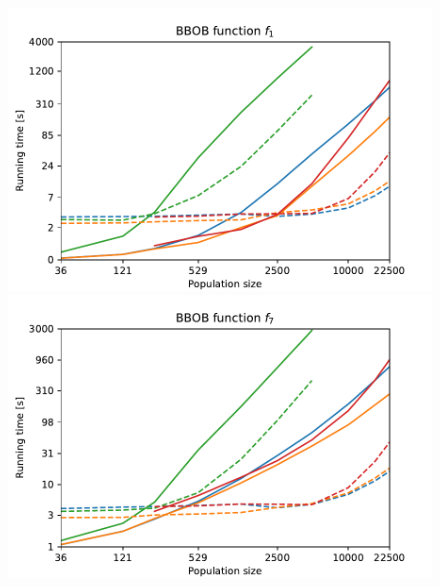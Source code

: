\begin{figure}[ht!]
    \begin{minipage}[t]{0.32\textwidth}
        \centering
        \includegraphics[width=\textwidth]{img/runs/time_pso2006_fn1_neigh.pdf}
    \end{minipage}
    \hfill
    \begin{minipage}[t]{0.32\textwidth}
        \centering
        \includegraphics[width=\textwidth]{img/runs/time_pso2006_fn7_neigh.pdf}
    \end{minipage}
    \hfill
    \begin{minipage}[t]{0.32\textwidth}
        \centering

\end{minipage}
\end{figure}
